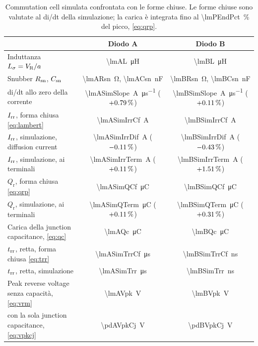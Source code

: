 \documentclass[10pt,a4paper]{scrartcl}
\let\newcommand\pdvaluedefine
\newcommand{\VR}{V_\mathrm{R}}
\newcommand{\Irr}{I_\mathrm{rr}}
\newcommand{\trr}{t_\mathrm{rr}}
\newcommand{\Csn}{C_\mathrm{sn}}
\newcommand{\Rsn}{R_\mathrm{sn}}
\newcommand{\Ls}{L_\sigma}                    %
\begin{document}
\begin{table}[htb]
\centering\small
\caption{Commutation cell simulata confrontata con le forme chiuse. Le forme chiuse sono valutate al di/dt della simulazione; la carica è integrata fino al \SI{\lmPEndPct}{\percent} del picco, \eqref{eq:qrp}.}
\label{tab:cell}
\begin{tabular}{@{}lcc@{}}
\toprule
 & Diodo A & Diodo B \\
\midrule
Induttanza $\Ls = \VR/a$ & \SI{\lmAL}{\micro\henry} & \SI{\lmBL}{\micro\henry} \\
Snubber $\Rsn$, $\Csn$ & \SI{\lmARsn}{\ohm}, \SI{\lmACsn}{\nano\farad} & \SI{\lmBRsn}{\ohm}, \SI{\lmBCsn}{\nano\farad} \\
di/dt allo zero della corrente & \SI{\lmASimSlope}{\ampere\per\micro\second} ($+0.79\,\%$) & \SI{\lmBSimSlope}{\ampere\per\micro\second} ($+0.11\,\%$) \\
\addlinespace
$\Irr$, forma chiusa \eqref{eq:lambert} & \SI{\lmASimIrrCf}{\ampere} & \SI{\lmBSimIrrCf}{\ampere} \\
$\Irr$, simulazione, diffusion current & \SI{\lmASimIrrDif}{\ampere} ($-0.11\,\%$) & \SI{\lmBSimIrrDif}{\ampere} ($-0.43\,\%$) \\
$\Irr$, simulazione, ai terminali & \SI{\lmASimIrrTerm}{\ampere} ($+0.11\,\%$) & \SI{\lmBSimIrrTerm}{\ampere} ($+1.51\,\%$) \\
\addlinespace
$Q_\mathrm{r}$, forma chiusa \eqref{eq:qrp} & \SI{\lmASimQCf}{\micro\coulomb} & \SI{\lmBSimQCf}{\micro\coulomb} \\
$Q_\mathrm{r}$, simulazione, ai terminali & \SI{\lmASimQTerm}{\micro\coulomb} ($+0.11\,\%$) & \SI{\lmBSimQTerm}{\micro\coulomb} ($+0.31\,\%$) \\
Carica della junction capacitance, \eqref{eq:qc} & \SI{\lmAQc}{\micro\coulomb} & \SI{\lmBQc}{\micro\coulomb} \\
\addlinespace
$\trr$, retta, forma chiusa \eqref{eq:trr} & \SI{\lmASimTrrCf}{\micro\second} & \SI{\lmBSimTrrCf}{\nano\second} \\
$\trr$, retta, simulazione & \SI{\lmASimTrr}{\micro\second} & \SI{\lmBSimTrr}{\nano\second} \\
\addlinespace
Peak reverse voltage senza capacità, \eqref{eq:vrm} & \SI{\lmAVpk}{\volt} & \SI{\lmBVpk}{\volt} \\
\quad con la sola junction capacitance, \eqref{eq:vpkcj} & \SI{\pdAVpkCj}{\volt} & \SI{\pdBVpkCj}{\volt} \\

\end{tabular}
\end{table}
\end{document}
